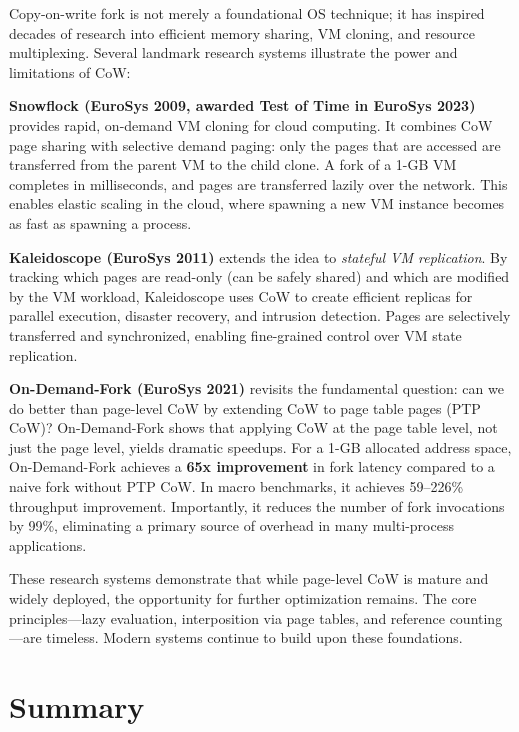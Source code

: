 \documentclass[11pt]{article}
\begin{document}
Copy-on-write fork is not merely a foundational OS technique; it has inspired decades of research into efficient memory sharing, VM cloning, and resource multiplexing. Several landmark research systems illustrate the power and limitations of CoW:

\textbf{Snowflock (EuroSys 2009, awarded Test of Time in EuroSys 2023)} provides rapid, on-demand VM cloning for cloud computing. It combines CoW page sharing with selective demand paging: only the pages that are accessed are transferred from the parent VM to the child clone. A fork of a 1-GB VM completes in milliseconds, and pages are transferred lazily over the network. This enables elastic scaling in the cloud, where spawning a new VM instance becomes as fast as spawning a process.

\textbf{Kaleidoscope (EuroSys 2011)} extends the idea to \emph{stateful VM replication}. By tracking which pages are read-only (can be safely shared) and which are modified by the VM workload, Kaleidoscope uses CoW to create efficient replicas for parallel execution, disaster recovery, and intrusion detection. Pages are selectively transferred and synchronized, enabling fine-grained control over VM state replication.

\textbf{On-Demand-Fork (EuroSys 2021)} revisits the fundamental question: can we do better than page-level CoW by extending CoW to page table pages (PTP CoW)? On-Demand-Fork shows that applying CoW at the page table level, not just the page level, yields dramatic speedups. For a 1-GB allocated address space, On-Demand-Fork achieves a \textbf{65x improvement} in fork latency compared to a naive fork without PTP CoW. In macro benchmarks, it achieves 59--226\% throughput improvement. Importantly, it reduces the number of fork invocations by 99\%, eliminating a primary source of overhead in many multi-process applications.

These research systems demonstrate that while page-level CoW is mature and widely deployed, the opportunity for further optimization remains. The core principles---lazy evaluation, interposition via page tables, and reference counting---are timeless. Modern systems continue to build upon these foundations.

\section{Summary}
\end{document}
